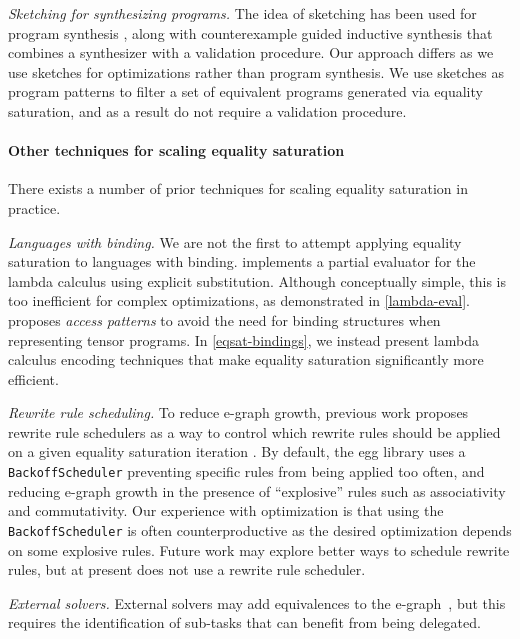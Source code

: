 
\emph{Sketching for synthesizing programs.}
The idea of sketching has been used for program synthesis \cite{solar2008-synthesis-sketching}, along with counterexample guided inductive synthesis that combines a synthesizer with a validation procedure.
Our approach differs as we use sketches for optimizations rather than program synthesis. 
We use sketches as program patterns to filter a set of equivalent programs generated via equality saturation, and as a result do not require a validation procedure.

\paragraph{\textbf{Other techniques for scaling equality saturation}}
There exists a number of prior techniques for scaling equality saturation in practice.

\emph{Languages with binding.}
We are not the first to attempt applying equality saturation to languages with binding.
\citet{willsey2021-egg} implements a partial evaluator for the lambda calculus using explicit substitution.
Although conceptually simple, this is too inefficient for complex optimizations, as demonstrated in \cref{lambda-eval}.
\citet{smith2021-access-patterns} proposes \emph{access patterns} to avoid the need for binding structures when representing tensor programs.
In \cref{eqsat-bindings}, we instead present lambda calculus encoding techniques that make equality saturation significantly more efficient.


\emph{Rewrite rule scheduling.}
To reduce e-graph growth, previous work proposes rewrite rule schedulers as a way to control which rewrite rules should be applied on a given equality saturation iteration \cite{willsey2021-egg}.
By default, the egg library uses a \texttt{BackoffScheduler} preventing specific rules from being applied too often, and reducing e-graph growth in the presence of ``explosive'' rules such as associativity and commutativity.
Our experience with \Rise{} optimization is that using the \texttt{BackoffScheduler} is often counterproductive as the desired optimization depends on some explosive rules.
Future work may explore better ways to schedule rewrite rules, but at present \kles{} does
not use a rewrite rule scheduler.

\emph{External solvers.}
External solvers may add equivalences to the e-graph~\cite{nandi2020-synthesizing-CAD}, but this requires the identification of sub-tasks that can benefit from being delegated.